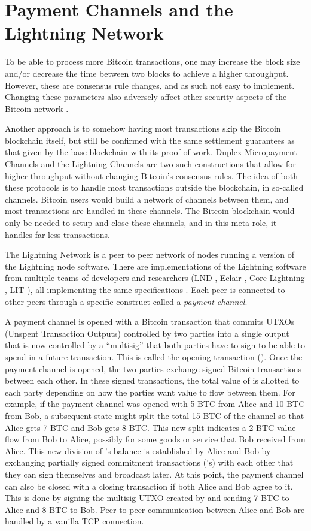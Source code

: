 \section{Payment Channels and the Lightning Network}
To be able to process more Bitcoin transactions, one may increase the block size and/or decrease the time between two blocks to achieve a higher throughput. However, these are consensus rule changes, and as such not easy to implement. Changing these parameters also adversely affect other security aspects of the Bitcoin network \cite{gervais2016security}. 

Another approach is to somehow having most transactions skip the Bitcoin blockchain itself, but still be confirmed with the same settlement guarantees as that given by the base blockchain with its proof of work. Duplex Micropayment Channels \cite{decker_wattenhofer} and the Lightning Channels \cite{poon_dryja} are two such constructions that allow for higher throughput without changing Bitcoin's consensus rules. The idea of both these protocols is to handle most transactions outside the blockchain, in so-called channels. Bitcoin users would build a network of channels between them, and most transactions are handled in these channels. The Bitcoin blockchain would only be needed to setup and close these channels, and in this meta role, it handles far less transactions. 

The Lightning Network is a peer to peer network of nodes running a version of the Lightning node software. There are implementations of the Lightning software from multiple teams of developers and researchers (LND \cite{lnd}, Eclair \cite{eclair}, Core-Lightning \cite{c_lightning}, LIT \cite{lit}), all implementing the same specifications \cite{bolt}. Each peer is connected to other peers through a specific construct called a \textit{payment channel}.

A payment channel is opened with a Bitcoin transaction that commits UTXOs (Unspent Transaction Outputs) controlled by two parties into a single output that is now controlled by a ``multisig'' that both parties have to sign to be able to spend in a future transaction. This is called the opening transaction (\topen{}). Once the payment channel is opened, the two parties exchange signed Bitcoin transactions between each other. In these signed transactions, the total value of \topen{} is allotted to each party depending on how the parties want value to flow between them. For example, if the payment channel was opened with 5 BTC from Alice and 10 BTC from Bob, a subsequent state might split the total 15 BTC of the channel so that Alice gets 7 BTC and Bob gets 8 BTC. This new split indicates a 2 BTC value flow from Bob to Alice, possibly for some goods or service that Bob received from Alice. This new division of \topen{}'s balance is established by Alice and Bob by exchanging partially signed commitment transactions (\ctx{}'s) with each other that they can sign themselves and broadcast later. At this point, the payment channel can also be closed with a closing transaction if both Alice and Bob agree to it. This is done by signing the multisig UTXO created by \topen{} and sending 7 BTC to Alice and 8 BTC to Bob. Peer to peer communication between Alice and Bob are handled by a vanilla TCP connection.

